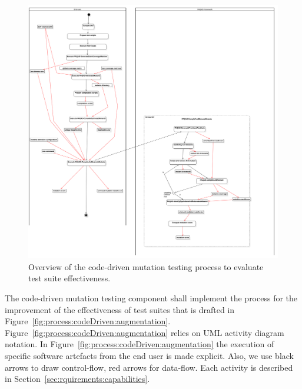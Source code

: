 \begin{figure}[h]
  \centering
	\includegraphics[width=15cm]{images/png/Activity1!CodeDrivenTestSuiteEvaluation_1.png}
      \caption{Overview of the code-driven mutation testing process to evaluate test suite effectiveness.}
      \label{fig:process:codeDriven:evaluation}
\end{figure}


\RQ{} The code-driven mutation testing component shall implement the process for the improvement of the effectiveness of test suites that is drafted in Figure~\ref{fig:process:codeDriven:augmentation}. Figure~\ref{fig:process:codeDriven:augmentation} relies on UML activity diagram notation. In Figure~\ref{fig:process:codeDriven:augmentation} the execution of specific software artefacts from the end user is made explicit. Also, we use black arrows to draw control-flow, red arrows for data-flow. Each activity is described in Section~\ref{sec:rquirements:capabilities}.

